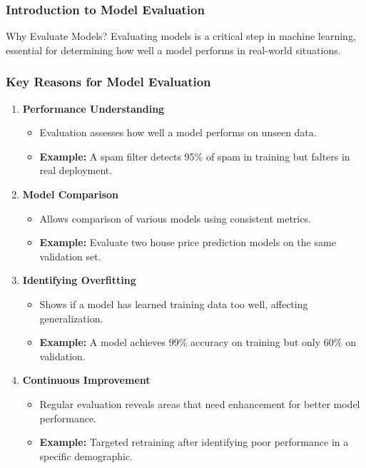 \documentclass[aspectratio=169]{beamer}
\begin{document}
\frame{\titlepage}

\begin{frame}[fragile]
    \frametitle{Introduction to Model Evaluation}
    \begin{block}{Why Evaluate Models?}
        Evaluating models is a critical step in machine learning, essential for determining how well a model performs in real-world situations.
    \end{block}
\end{frame}

\begin{frame}[fragile]
    \frametitle{Key Reasons for Model Evaluation}
    \begin{enumerate}
        \item \textbf{Performance Understanding}
        \begin{itemize}
            \item Evaluation assesses how well a model performs on unseen data.
            \item \textbf{Example:} A spam filter detects 95\% of spam in training but falters in real deployment.
        \end{itemize}
        
        \item \textbf{Model Comparison}
        \begin{itemize}
            \item Allows comparison of various models using consistent metrics.
            \item \textbf{Example:} Evaluate two house price prediction models on the same validation set.
        \end{itemize}
        
        \item \textbf{Identifying Overfitting}
        \begin{itemize}
            \item Shows if a model has learned training data too well, affecting generalization.
            \item \textbf{Example:} A model achieves 99\% accuracy on training but only 60\% on validation.
        \end{itemize}
        
        \item \textbf{Continuous Improvement}
        \begin{itemize}
            \item Regular evaluation reveals areas that need enhancement for better model performance.
            \item \textbf{Example:} Targeted retraining after identifying poor performance in a specific demographic.
        \end{itemize}
    \end{enumerate}
\end{frame}
\end{document}
